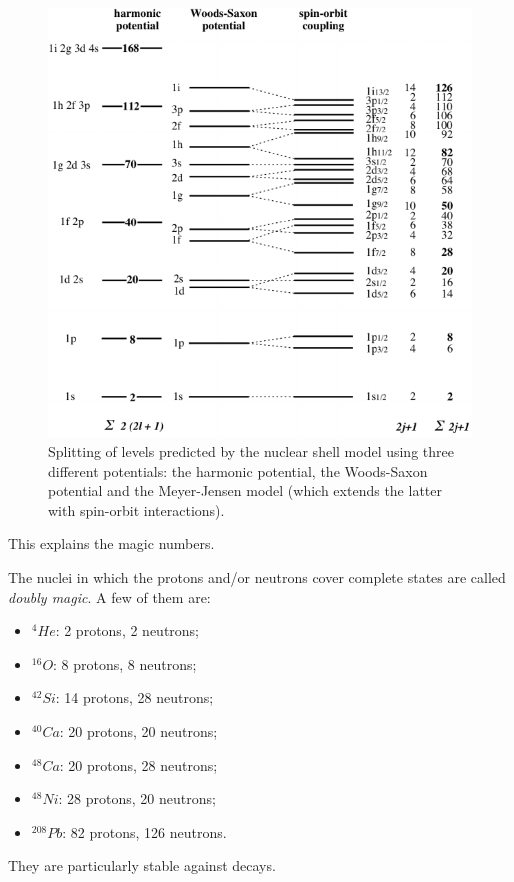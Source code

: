 \begin{figure}[h]
    \centering
    \includegraphics[scale=0.8]{Figures/nuclear-physics-fig15}
    \caption{Splitting of levels predicted by the nuclear shell model using three different potentials: the harmonic potential, the Woods-Saxon potential and the Meyer-Jensen model (which extends the latter with spin-orbit interactions).}
    \label{nuclear-physics-fig:15}
\end{figure}
This explains the magic numbers.

The nuclei in which the protons and/or neutrons cover complete states are called \emph{doubly magic}. A few of them are:
\begin{itemize}
    \item \(^{4}He\): 2 protons, 2 neutrons;
    \item \(^{16}O\): 8 protons, 8 neutrons;
    \item \(^{42}Si\): 14 protons, 28 neutrons;
    \item \(^{40}Ca\): 20 protons, 20 neutrons;
    \item \(^{48}Ca\): 20 protons, 28 neutrons;
    \item \(^{48}Ni\): 28 protons, 20 neutrons;
    \item \(^{208}Pb\): 82 protons, 126 neutrons.
\end{itemize}
They are particularly stable against decays.

